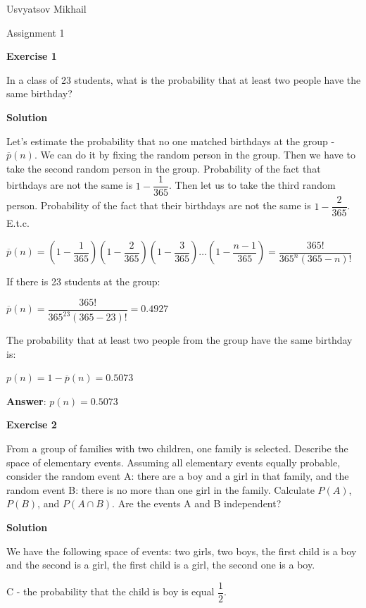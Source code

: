 \documentclass[12pt]{article}
\theoremstyle{definiton}
\theoremstyle{definition}
\theoremstyle{definition}
\begin{document}
	Usvyatsov Mikhail
	
	
	\centerline{\LARGE Assignment 1}

	\bigskip
	
		\textbf{Exercise 1}		
		
		In a class of 23 students, what is the probability that at least two people have the same
birthday?
		\medskip
		
		\textbf{Solution}

		Let's estimate the probability that no one matched birthdays at the group - $\overline{p}(n)$. We can do it by fixing the random person in the group. Then we have to take the second random person in the group. Probability of the fact that birthdays are not the same is $1 - \dfrac{1}{365}$. Then let us to take the third random person. Probability of the fact that their birthdays are not the same is $1 - \dfrac{2}{365}$. E.t.c.
		
		$\overline{p}\left(n\right) = \left(1-\dfrac{1}{365}\right)\left(1-\dfrac{2}{365}\right)\left(1-\dfrac{3}{365}\right)\ldots\left(1-\dfrac{n-1}{365}\right)=\dfrac{365!}{365^n\left(365-n\right)!}$
		
		If there is 23 students at the group:
		
		$\overline{p}\left(n\right) = \dfrac{365!}{365^{23}\left(365-23\right)!}=0.4927$
		
		The probability that at least two people from the group have the same birthday is:
	
		$p\left(n\right)=1-\overline{p}\left(n\right)=0.5073$
		
		\medskip
		\textbf{Answer}: $p\left(n\right)=0.5073$
		
		
		\bigskip
		\textbf{Exercise 2}		
		
		From a group of families with two children, one family is selected. Describe the space of elementary events. Assuming all elementary events equally probable, consider the random event A: there are a boy and a girl in that family, and the random event B: there is no more than one girl in the family. Calculate $P\left(A\right)$, $P\left(B\right)$, and $P\left(A \cap B\right)$. Are the events A and B independent?
		\medskip
		
		\textbf{Solution}

We have the following space of events: two girls, two boys, the first child is a boy and the second is a girl, the first child is a girl, the second one is a boy.

		C - the probability that the child is boy is equal $\dfrac{1}{2}$.
	
\end{document}
